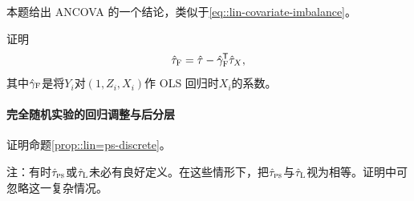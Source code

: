 本题给出 ANCOVA 的一个结论，类似于\eqref{eq::lin-covariate-imbalance}。 

证明
$$
\hat{\tau}_\textsc{F} =\hat\tau  - \hat\gamma_\textsc{F}^{\mkern-1.5mu\mathsf{T}} \hat\tau_X,
$$
其中$ \hat\gamma_\textsc{F}$是将$Y_i$对$(1,Z_i, X_i)$作 OLS 回归时$X_i$的系数。 





 \paragraph{完全随机实验的回归调整与后分层}\label{para::lin=ps-discrete}
 
 证明命题\ref{prop::lin=ps-discrete}。 
 
 
注：有时$\hat{\tau}_{\textsc{ps}}$或$ \hat{\tau}_\textsc{L}$未必有良好定义。在这些情形下，把$\hat{\tau}_{\textsc{ps}}$与$ \hat{\tau}_\textsc{L}$视为相等。证明中可忽略这一复杂情况。 
 
%
%
%


 
%
%
%
%
%
%


